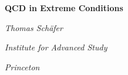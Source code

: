 

\textheight 28cm
\textwidth 16cm
\hoffset -1cm
\voffset -2cm


\pagestyle{plain}


\centerline{\Large\bf QCD in Extreme Conditions}
\vspace*{0.8cm}
\centerline{\large\it Thomas Sch\"afer}
\vspace*{0.3cm}
\centerline{\large\it Institute for Advanced Study}
\vspace*{0.3cm}
\centerline{\large\it Princeton}


\begin{figure}[h]
\begin{center}
\begin{minipage}{70mm}
\epsfxsize=14cm
\end{minipage}
\end{center}
\end{figure}






